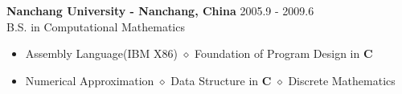 \documentclass[10pt]{article}
\newcommand{\college}[5]{
    \textbf{#1 #2} \hfill #3 \\ #4 \\ #5
}
\begin{document}
\vspace*{5pt}

\college{Nanchang University}{- Nanchang, China} {2005.9 - 2009.6}
{B.S. in Computational Mathematics}
{
\begin{itemize}
  \setlength{\itemsep}{0pt}
  \setlength{\parsep}{0pt}
  \setlength{\parskip}{0pt}
  \item {Assembly Language(IBM X86) $\diamond$ Foundation of Program Design in \textbf{C}}
  \item {Numerical Approximation $\diamond$ Data Structure in \textbf{C} $\diamond$ Discrete Mathematics}
\end{itemize}
}

\end{document}
